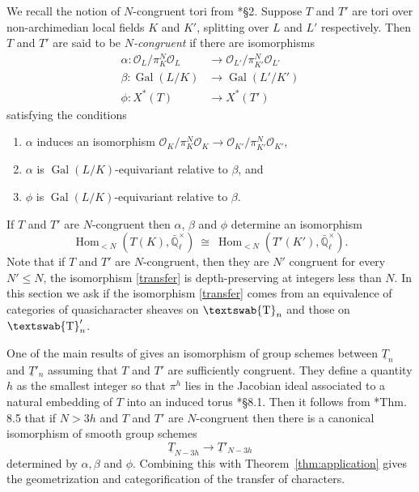 \documentclass[11pt]{amsart}
\newcommand{\mathswab}[1]{\operatorname{\textswab{#1}}}
\theoremstyle{plain}
\theoremstyle{definition}
\theoremstyle{remark}
\newcommand{\EE}{\mathbb{\bar Q}_\ell}
\newcommand{\OK}{\mathcal{O}_K}
\newcommand{\OL}{\mathcal{O}_L}
\newcommand{\OO}[1]{\mathcal{O}_{#1}}
\newcommand{\EEx}{\EE^\times}
\DeclareMathOperator{\Gal}{Gal}
\DeclareMathOperator{\Hom}{Hom}
\newcommand{\iso}{{\ \cong\ }}
\newcommand{\GN}[1]{\mathswab{#1}}
\newcommand{\TT}{\underline{T}}
\begin{document}
We recall the notion of $N$-congruent tori from  \cite{chai-yu:01a}*{\S 2}.
Suppose $T$ and $T'$ are tori over non-archimedian local fields $K$ and $K'$,
splitting over $L$ and $L'$ respectively.
Then $T$ and $T'$ are said to be \emph{$N$-congruent} if there are isomorphisms
 \begin{align*}
  \alpha : \OL/\pi_K^N \OL &\to \OO{L'}/\pi_{K'}^N \OO{L'} \\
  \beta : \Gal(L/K) &\to \Gal(L'/K') \\
  \phi : X^*(T) &\to X^*(T')
 \end{align*}
 satisfying the conditions
 \begin{enumerate}
  \item $\alpha$ induces an isomorphism $\OK/\pi_K^N \OK \to \OO{K'}/\pi_{K'}^N \OO{K'}$,
  \item $\alpha$ is $\Gal(L/K)$-equivariant relative to $\beta$, and
  \item $\phi$ is $\Gal(L/K)$-equivariant relative to $\beta$.
 \end{enumerate}
If $T$ and $T'$ are $N$-congruent then $\alpha$, $\beta$ and $\phi$ determine an isomorphism
\begin{equation}\label{transfer}
  \Hom_{<N}(T(K), \EEx) \iso \Hom_{<N}(T'(K'),\EEx).
\end{equation}
Note that if $T$ and $T'$ are $N$-congruent, then they are $N'$ congruent for every
$N' \leq N$, the isomorphism \eqref{transfer} is depth-preserving at integers less than $N$.
In this section we ask if the isomorphism \eqref{transfer} comes from an equivalence of
categories of quasicharacter sheaves on $\GN{T}_n$ and those on $\GN{T}'_n$.

One of the main results of \cite{chai-yu:01a} gives an isomorphism of group schemes between
$\TT_n$ and $\TT'_n$ assuming that $T$ and $T'$ are sufficiently congruent.
They define a quantity $h$ as the smallest integer so that $\pi^h$ lies in the
Jacobian ideal associated to a natural embedding of $T$ into an induced torus \cite{chai-yu:01a}*{\S 8.1}.
Then it follows from \cite{chai-yu:01a}*{Thm. 8.5} that if $N > 3h$ and $T$ and $T'$ are $N$-congruent 
then there is a canonical isomorphism of smooth group schemes
 \[
  \TT_{N-3h} \to \TT'_{N-3h}
 \]
 determined by $\alpha, \beta$ and $\phi$.
Combining this with Theorem~\ref{thm:application} gives the geometrization and categorification of the transfer of characters.
\end{document}
